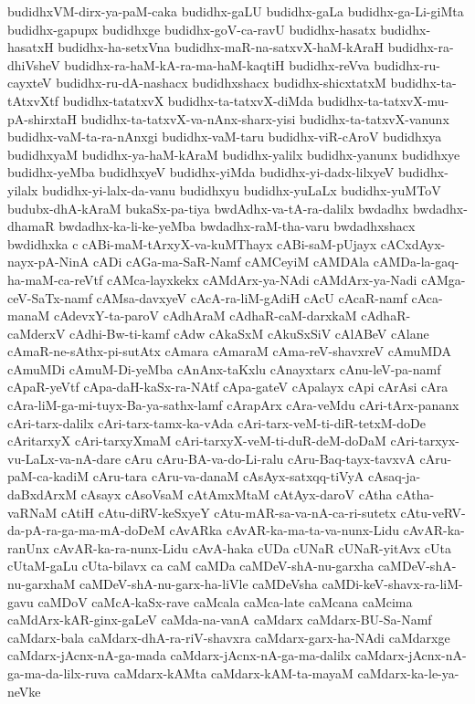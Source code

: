 {budidhxVM-dirx-ya-paM-caka
budidhx-gaLU
budidhx-gaLa
budidhx-ga-Li-giMta
budidhx-gapupx
budidhxge
budidhx-goV-ca-ravU
budidhx-hasatx
budidhx-hasatxH
budidhx-ha-setxVna
budidhx-maR-na-satxvX-haM-kAraH
budidhx-ra-dhiVsheV
budidhx-ra-haM-kA-ra-ma-haM-kaqtiH
budidhx-reVva
budidhx-ru-cayxteV
budidhx-ru-dA-nashacx
budidhxshacx
budidhx-shicxtatxM
budidhx-ta-tAtxvXtf
budidhx-tatatxvX
budidhx-ta-tatxvX-diMda
budidhx-ta-tatxvX-mu-pA-shirxtaH
budidhx-ta-tatxvX-va-nAnx-sharx-yisi
budidhx-ta-tatxvX-vanunx
budidhx-vaM-ta-ra-nAnxgi
budidhx-vaM-taru
budidhx-viR-cAroV
budidhxya
budidhxyaM
budidhx-ya-haM-kAraM
budidhx-yalilx
budidhx-yanunx
budidhxye
budidhx-yeMba
budidhxyeV
budidhx-yiMda
budidhx-yi-dadx-lilxyeV
budidhx-yilalx
budidhx-yi-lalx-da-vanu
budidhxyu
budidhx-yuLaLx
budidhx-yuMToV
budubx-dhA-kAraM
bukaSx-pa-tiya
bwdAdhx-va-tA-ra-dalilx
bwdadhx
bwdadhx-dhamaR
bwdadhx-ka-li-ke-yeMba
bwdadhx-raM-tha-varu
bwdadhxshacx
bwdidhxka
c
cABi-maM-tArxyX-va-kuMThayx
cABi-saM-pUjayx
cACxdAyx-nayx-pA-NinA
cADi
cAGa-ma-SaR-Namf
cAMCeyiM
cAMDAla
cAMDa-la-gaq-ha-maM-ca-reVtf
cAMca-layxkekx
cAMdArx-ya-NAdi
cAMdArx-ya-Nadi
cAMga-ceV-SaTx-namf
cAMsa-davxyeV
cAcA-ra-liM-gAdiH
cAcU
cAcaR-namf
cAca-manaM
cAdevxY-ta-paroV
cAdhAraM
cAdhaR-caM-darxkaM
cAdhaR-caMderxV
cAdhi-Bw-ti-kamf
cAdw
cAkaSxM
cAkuSxSiV
cAlABeV
cAlane
cAmaR-ne-sAthx-pi-sutAtx
cAmara
cAmaraM
cAma-reV-shavxreV
cAmuMDA
cAmuMDi
cAmuM-Di-yeMba
cAnAnx-taKxlu
cAnayxtarx
cAnu-leV-pa-namf
cApaR-yeVtf
cApa-daH-kaSx-ra-NAtf
cApa-gateV
cApalayx
cApi
cArAsi
cAra
cAra-liM-ga-mi-tuyx-Ba-ya-sathx-lamf
cArapArx
cAra-veMdu
cAri-tArx-pananx
cAri-tarx-dalilx
cAri-tarx-tamx-ka-vAda
cAri-tarx-veM-ti-diR-tetxM-doDe
cAritarxyX
cAri-tarxyXmaM
cAri-tarxyX-veM-ti-duR-deM-doDaM
cAri-tarxyx-vu-LaLx-va-nA-dare
cAru
cAru-BA-va-do-Li-ralu
cAru-Baq-tayx-tavxvA
cAru-paM-ca-kadiM
cAru-tara
cAru-va-danaM
cAsAyx-satxqq-tiVyA
cAsaq-ja-daBxdArxM
cAsayx
cAsoVsaM
cAtAmxMtaM
cAtAyx-daroV
cAtha
cAtha-vaRNaM
cAtiH
cAtu-diRV-keSxyeY
cAtu-mAR-sa-va-nA-ca-ri-sutetx
cAtu-veRV-da-pA-ra-ga-ma-mA-doDeM
cAvARka
cAvAR-ka-ma-ta-va-nunx-Lidu
cAvAR-ka-ranUnx
cAvAR-ka-ra-nunx-Lidu
cAvA-haka
cUDa
cUNaR
cUNaR-yitAvx
cUta
cUtaM-gaLu
cUta-bilavx
ca
caM
caMDa
caMDeV-shA-nu-garxha
caMDeV-shA-nu-garxhaM
caMDeV-shA-nu-garx-ha-liVle
caMDeVsha
caMDi-keV-shavx-ra-liM-gavu
caMDoV
caMcA-kaSx-rave
caMcala
caMca-late
caMcana
caMcima
caMdArx-kAR-ginx-gaLeV
caMda-na-vanA
caMdarx
caMdarx-BU-Sa-Namf
caMdarx-bala
caMdarx-dhA-ra-riV-shavxra
caMdarx-garx-ha-NAdi
caMdarxge
caMdarx-jAcnx-nA-ga-mada
caMdarx-jAcnx-nA-ga-ma-dalilx
caMdarx-jAcnx-nA-ga-ma-da-lilx-ruva
caMdarx-kAMta
caMdarx-kAM-ta-mayaM
caMdarx-ka-le-ya-neVke
}
